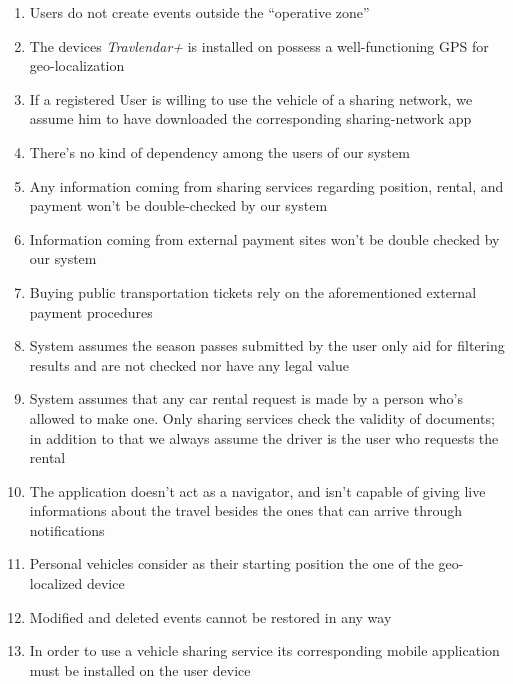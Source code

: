 	\begin{enumerate}
		
			\item Users do not create events outside the “operative zone”

			\item The devices \textit{Travlendar+} is installed on possess a well-functioning GPS for geo-localization

			\item If a registered User is willing to use the vehicle of a sharing network, we assume him to have downloaded the corresponding sharing-network app

			\item There’s no kind of dependency among the users of our system

			\item Any information coming from sharing services regarding position, rental, and payment won’t be double-checked by our system

			\item Information coming from external payment sites won’t be double checked by our system

			\item Buying public transportation tickets rely on the aforementioned external payment procedures

			\item System assumes the season passes submitted by the user only aid for filtering results and are not checked nor have any legal value

			\item System assumes that any car rental request is made by a person who’s allowed to make one. Only sharing services check the validity of documents; in addition to that we always assume the driver is the user who requests the rental

			\item The application doesn't act as a navigator, and isn't capable of giving live informations about the travel besides the ones that can arrive through notifications
			
			\item Personal vehicles consider as their starting position the one of the geo-localized device
			
			\item Modified and deleted events cannot be restored in any way
			
			\item In order to use a vehicle sharing service its corresponding mobile application must be installed on the user device 
			
		\end{enumerate}
